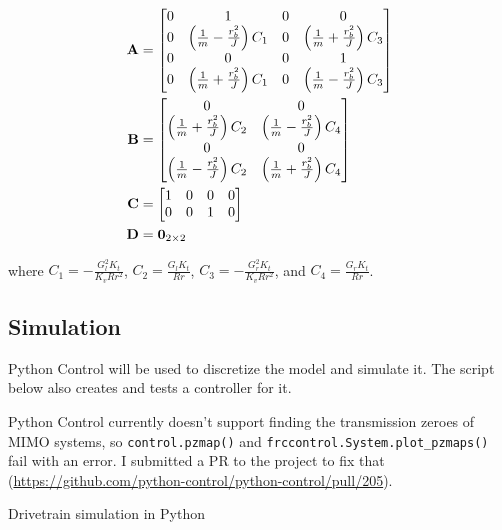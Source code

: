 \begin{align}
  \mathbf{A} &=
  \begin{bmatrix}
    0 & 1 & 0 & 0 \\
    0 & \left(\frac{1}{m} - \frac{r_b^2}{J}\right) C_1 & 0 & \left(\frac{1}{m} + \frac{r_b^2}{J}\right) C_3 \\
    0 & 0 & 0 & 1 \\
    0 & \left(\frac{1}{m} + \frac{r_b^2}{J}\right) C_1 & 0 & \left(\frac{1}{m} - \frac{r_b^2}{J}\right) C_3
  \end{bmatrix} \\
  \mathbf{B} &=
  \begin{bmatrix}
    0 & 0 \\
    \left(\frac{1}{m} + \frac{r_b^2}{J}\right) C_2 & \left(\frac{1}{m} - \frac{r_b^2}{J}\right) C_4 \\
    0 & 0 \\
    \left(\frac{1}{m} - \frac{r_b^2}{J}\right) C_2 & \left(\frac{1}{m} + \frac{r_b^2}{J}\right) C_4
  \end{bmatrix} \\
  \mathbf{C} &=
  \begin{bmatrix}
    1 & 0 & 0 & 0 \\
    0 & 0 & 1 & 0 \\
  \end{bmatrix} \\
  \mathbf{D} &= \mathbf{0}_{2 \times 2}
\end{align}

where $C_1 = -\frac{G_l^2 K_t}{K_v R r^2}$, $C_2 = \frac{G_l K_t}{Rr}$,
$C_3 = -\frac{G_r^2 K_t}{K_v R r^2}$, and $C_4 = \frac{G_r K_t}{Rr}$.

\subsection{Simulation}

Python Control will be used to discretize the model and simulate it. The script
below also creates and tests a controller for it.

\begin{remark}
  Python Control currently doesn't support finding the transmission zeroes of
  MIMO systems, so \texttt{control.pzmap()} and
  \texttt{frccontrol.System.plot\_pzmaps()} fail with an error. I submitted a PR
  to the project to fix that
  (\url{https://github.com/python-control/python-control/pull/205}).
\end{remark}

\begin{snippet}
  \caption{Drivetrain simulation in Python}
  \label{lst:drivetrain_sim}
\end{snippet}
